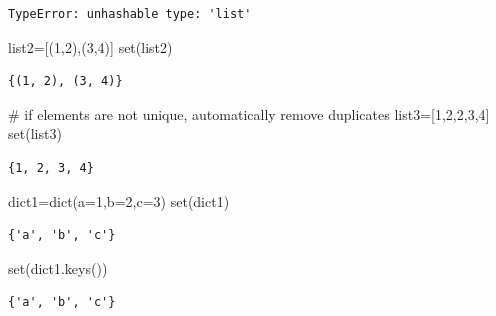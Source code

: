 \documentclass[
  a4paper,
  DIV=11,
  numbers=noendperiod]{scrreprt}
\newenvironment{Shaded}{\begin{snugshade}}{\end{snugshade}}
\newcommand{\BuiltInTok}[1]{\textcolor[rgb]{0.00,0.23,0.31}{#1}}
\newcommand{\CommentTok}[1]{\textcolor[rgb]{0.37,0.37,0.37}{#1}}
\newcommand{\DecValTok}[1]{\textcolor[rgb]{0.68,0.00,0.00}{#1}}
\newcommand{\NormalTok}[1]{\textcolor[rgb]{0.00,0.23,0.31}{#1}}
\newcommand{\OperatorTok}[1]{\textcolor[rgb]{0.37,0.37,0.37}{#1}}
\begin{document}
\begin{verbatim}
TypeError: unhashable type: 'list'
\end{verbatim}

\begin{Shaded}
\begin{Highlighting}[]
\NormalTok{list2}\OperatorTok{=}\NormalTok{[(}\DecValTok{1}\NormalTok{,}\DecValTok{2}\NormalTok{),(}\DecValTok{3}\NormalTok{,}\DecValTok{4}\NormalTok{)]}
\BuiltInTok{set}\NormalTok{(list2)}
\end{Highlighting}
\end{Shaded}

\begin{verbatim}
{(1, 2), (3, 4)}
\end{verbatim}

\begin{Shaded}
\begin{Highlighting}[]
\CommentTok{\# if elements are not unique, automatically remove duplicates}
\NormalTok{list3}\OperatorTok{=}\NormalTok{[}\DecValTok{1}\NormalTok{,}\DecValTok{2}\NormalTok{,}\DecValTok{2}\NormalTok{,}\DecValTok{3}\NormalTok{,}\DecValTok{4}\NormalTok{]}
\BuiltInTok{set}\NormalTok{(list3)}
\end{Highlighting}
\end{Shaded}

\begin{verbatim}
{1, 2, 3, 4}
\end{verbatim}

\begin{Shaded}
\begin{Highlighting}[]
\NormalTok{dict1}\OperatorTok{=}\BuiltInTok{dict}\NormalTok{(a}\OperatorTok{=}\DecValTok{1}\NormalTok{,b}\OperatorTok{=}\DecValTok{2}\NormalTok{,c}\OperatorTok{=}\DecValTok{3}\NormalTok{)}
\BuiltInTok{set}\NormalTok{(dict1)}
\end{Highlighting}
\end{Shaded}

\begin{verbatim}
{'a', 'b', 'c'}
\end{verbatim}

\begin{Shaded}
\begin{Highlighting}[]
\BuiltInTok{set}\NormalTok{(dict1.keys())}
\end{Highlighting}
\end{Shaded}

\begin{verbatim}
{'a', 'b', 'c'}
\end{verbatim}
\end{document}
